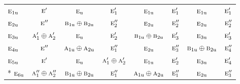 \documentclass[10pt,a4paper]{article}
\numberwithin{equation}{section}
\newcommand{\irr}[1]{\text{\normalfont\scshape #1}}
\newcommand{\ptag}[1]{\mathrm{#1}}
\begin{document}
{\begin{longtable}{@{}lccccccc@{}}
$\irr{e}_{1\ptag{u}}$ & $\irr{e}'$ & $\irr{e}_{\ptag{u}}$ & $\irr{e}_{1}'$ & $\irr{e}_{1\ptag{u}}$ & $\irr{e}_{1}'$ & $\irr{e}_{1\ptag{u}}$ & $\irr{e}_{1}'$\\
$\irr{e}_{2\ptag{u}}$ & $\irr{e}''$ & $\irr{b}_{1\ptag{u}}\oplus \irr{b}_{2\ptag{u}}$ & $\irr{e}_{2}''$ & $\irr{e}_{2\ptag{u}}$ & $\irr{e}_{2}''$ & $\irr{e}_{2\ptag{u}}$ & $\irr{e}_{2}''$\\
$\irr{e}_{3\ptag{u}}$ & $\irr{a}_{1}'\oplus \irr{a}_{2}'$ & $\irr{e}_{\ptag{u}}$ & $\irr{e}_{2}'$ & $\irr{b}_{1\ptag{u}}\oplus \irr{b}_{2\ptag{u}}$ & $\irr{e}_{3}'$ & $\irr{e}_{3\ptag{u}}$ & $\irr{e}_{3}'$\\
$\irr{e}_{4\ptag{u}}$ & $\irr{e}''$ & $\irr{a}_{1\ptag{u}}\oplus \irr{a}_{2\ptag{u}}$ & $\irr{e}_{1}''$ & $\irr{e}_{2\ptag{u}}$ & $\irr{e}_{3}''$ & $\irr{b}_{1\ptag{u}}\oplus \irr{b}_{2\ptag{u}}$ & $\irr{e}_{4}''$\\
$\irr{e}_{5\ptag{u}}$ & $\irr{e}'$ & $\irr{e}_{\ptag{u}}$ & $\irr{a}_{1}'\oplus \irr{a}_{2}'$ & $\irr{e}_{1\ptag{u}}$ & $\irr{e}_{2}'$ & $\irr{e}_{3\ptag{u}}$ & $\irr{e}_{4}'$\\*
$\irr{e}_{6\ptag{u}}$ & $\irr{a}_{1}''\oplus \irr{a}_{2}''$ & $\irr{b}_{1\ptag{u}}\oplus \irr{b}_{2\ptag{u}}$ & $\irr{e}_{1}''$ & $\irr{a}_{1\ptag{u}}\oplus \irr{a}_{2\ptag{u}}$ & $\irr{e}_{1}''$ & $\irr{e}_{2\ptag{u}}$ & $\irr{e}_{3}''$\\
\bottomrule\end{longtable}}
\end{document}
